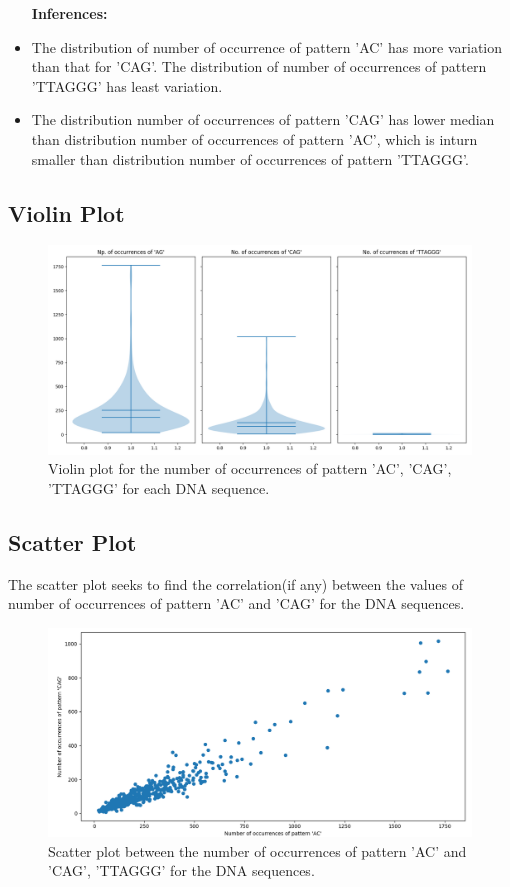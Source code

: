 \documentclass{article}
\begin{document}
			\begin{itemize}\itemsep1pt
				\item [\textbf{Inferences:}]
				\item The distribution of number of occurrence of pattern 'AC' has more variation than that for 'CAG'. The distribution of number of occurrences of pattern 'TTAGGG' has least variation.
				\item The distribution number of occurrences of pattern 'CAG' has lower median than distribution number of occurrences of pattern 'AC', which is inturn smaller than distribution number of occurrences of pattern 'TTAGGG'.
			\end{itemize}

		\subsection{Violin Plot}
		
			\begin{figure}[!htbp]
				\centering
				\includegraphics[scale=0.4]{charts/Figure_8}
				\caption{Violin plot for the number of occurrences of pattern 'AC', 'CAG', 'TTAGGG' for each DNA sequence.}
			\end{figure}
		
		\subsection{Scatter Plot}
			
			The scatter plot seeks to find the correlation(if any) between the values of number of occurrences of pattern 'AC' and 'CAG' for the DNA sequences.
			
			\begin{figure}[!htbp]
				\centering
				\includegraphics[scale=0.48]{charts/Figure_9}
				\caption{Scatter plot between the number of occurrences of pattern 'AC' and 'CAG', 'TTAGGG' for the DNA sequences.}
			\end{figure}
		
\end{document}
